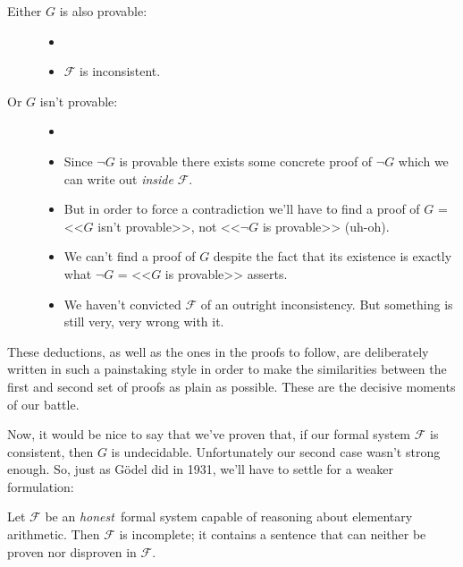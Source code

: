 \documentclass{article}
\theoremstyle{customstyle}
\newcommand{\F}{\ensuremath{\mathcal{F}}}
\begin{document}
\begin{description}
\begin{description}
\item[Either $G$ is also provable:]
\begin{itemize}
\item[]
\item $\F$ is inconsistent.
\end{itemize}
\item[Or $G$ isn't provable:]
\begin{itemize}
\item[]
\item Since $\neg G$ is provable there exists some concrete proof of $\neg G$ which we can write out \textit{inside} $\F$.
\item But in order to force a contradiction we'll have to find a proof of $G$ = <<$G$ isn't provable>>, not <<$\neg G$ is provable>> (uh-oh).
\item We can't find a proof of $G$ despite the fact that its existence is exactly what $\neg G$ = <<$G$ is provable>> asserts.
\item We haven't convicted $\F$ of an outright inconsistency. But something is still very, very wrong with it.
\end{itemize}
\end{description}
\end{description}

These deductions, as well as the ones in the proofs to follow, are deliberately written in such a painstaking style in order to make the similarities between the first and second set of proofs as plain as possible. These are the decisive moments of our battle.

Now, it would be nice to say that we've proven that, if our formal system $\F$ is consistent, then $G$ is undecidable. Unfortunately our second case wasn't strong enough. So, just as Gödel did in 1931, we'll have to settle for a weaker formulation:

\begin{theorem}
Let $\F$ be an \textit{honest}\footnotemark\ formal system capable of reasoning about elementary arithmetic. Then $\F$ is incomplete; it contains a sentence that can neither be proven nor disproven in $\F$.
\end{theorem}
\end{document}
